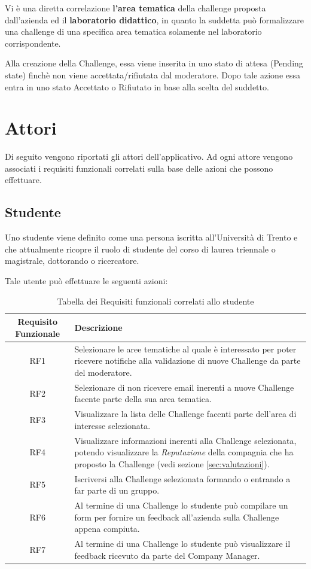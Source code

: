Vi è una diretta correlazione \textbf{l'area tematica} della challenge proposta dall'azienda ed il \textbf{laboratorio didattico}, in quanto la suddetta può formalizzare una challenge di una specifica area tematica solamente nel laboratorio corrispondente.

Alla creazione della Challenge, essa viene inserita in uno stato di attesa (Pending state) finchè non viene accettata/rifiutata dal moderatore. Dopo tale azione essa entra in uno stato Accettato o Rifiutato in base alla scelta del suddetto.

\section{Attori}
Di seguito vengono riportati gli attori dell'applicativo. Ad ogni attore vengono associati i requisiti funzionali correlati sulla base delle azioni che possono effettuare.

\subsection{Studente}
Uno studente viene definito come una persona iscritta all'Università di Trento e che attualmente ricopre il ruolo di studente del corso di laurea triennale o magistrale, dottorando o ricercatore.

Tale utente può effettuare le seguenti azioni:

\begin{table}[ht]
    \centering
    \begin{tabularx}{\textwidth}{|c|X|}
        \hline
        \textbf{Requisito Funzionale} & \textbf{Descrizione}\\
        \hline
        RF1 & Selezionare le aree tematiche al quale è interessato per poter ricevere notifiche alla validazione di nuove Challenge da parte del moderatore.\\
        \hline
        RF2 & Selezionare di non ricevere email inerenti a nuove Challenge facente parte della sua area tematica.\\
       \hline
        RF3 & Visualizzare la lista delle Challenge facenti parte dell'area di interesse selezionata.\\ 
        \hline
        RF4 & Visualizzare informazioni inerenti alla Challenge selezionata, potendo visualizzare la \textit{Reputazione} della compagnia che ha proposto la Challenge (vedi sezione \ref{sec:valutazioni}).\\ 
        \hline
        RF5 & Iscriversi alla Challenge selezionata formando o entrando a far parte di un gruppo.\\ 
        \hline
        RF6 & Al termine di una Challenge lo studente può compilare un form per fornire un feedback all'azienda sulla Challenge appena compiuta.\\ 
        \hline
        RF7 & Al termine di una Challenge lo studente può visualizzare il feedback ricevuto da parte del Company Manager.\\ 
        \hline
    \end{tabularx}
    \caption{Tabella dei Requisiti funzionali correlati allo studente}
\end{table}



